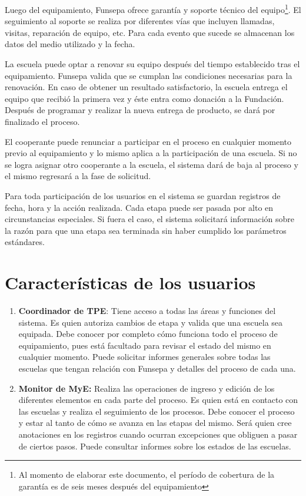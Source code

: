 \documentclass[11pt]{report}
\begin{document}
	Luego del equipamiento, Funsepa ofrece garantía y soporte técnico del equipo\footnote{Al momento de elaborar este documento, el período de cobertura de la garantía es de seis meses después del equipamiento}. El seguimiento al soporte se realiza por diferentes vías que incluyen llamadas, visitas, reparación de equipo, etc. Para cada evento que sucede se almacenan los datos del medio utilizado y la fecha.
	
	La escuela puede optar a renovar su equipo después del tiempo establecido tras el equipamiento. Funsepa valida que se cumplan las condiciones necesarias para la renovación. En caso de obtener un resultado satisfactorio, la escuela entrega el equipo que recibió la primera vez y éste entra como donación a la Fundación. Después de programar y realizar la nueva entrega de producto, se dará por finalizado el proceso.
	
	El cooperante puede renunciar a participar en el proceso en cualquier momento previo al equipamiento y lo mismo aplica a la participación de una escuela. Si no se logra asignar otro cooperante a la escuela, el sistema dará de baja al proceso y el mismo regresará a la fase de solicitud.
	
	Para toda participación de los usuarios en el sistema se guardan registros de fecha, hora y la acción realizada. Cada etapa puede ser pasada por alto en circunstancias especiales. Si fuera el caso, el sistema solicitará información sobre la razón para que una etapa sea terminada sin haber cumplido los parámetros estándares.
	
	\section{Características de los usuarios}
	\begin{enumerate}
		\item \textbf{Coordinador de TPE}: Tiene acceso a todas las áreas y funciones del sistema. Es quien autoriza cambios de etapa y valida que una escuela sea equipada.
		Debe conocer por completo cómo funciona todo el proceso de equipamiento, pues está facultado para revisar el estado del mismo en cualquier momento.
		Puede solicitar informes generales sobre todas las escuelas que tengan relación con Funsepa y detalles del proceso de cada una.
		\item \textbf{Monitor de MyE:} Realiza las operaciones de ingreso y edición de los diferentes elementos en cada parte del proceso. Es quien está en contacto con las escuelas y realiza el seguimiento de los procesos.
		Debe conocer el proceso y estar al tanto de cómo se avanza en las etapas del mismo. Será quien cree anotaciones en los registros cuando ocurran excepciones que obliguen a pasar de ciertos pasos.
		Puede consultar informes sobre los estados de las escuelas.
	\end{enumerate}
	
\end{document}
